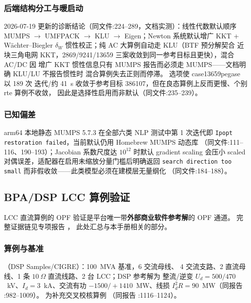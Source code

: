 \subsubsection*{后端结构分工与暖启动}
2026-07-19 更新的诊断结论（同文件:224--289，文档实测）：线性代数默认顺序
MUMPS $\to$ UMFPACK $\to$ KLU $\to$ Eigen；Newton 系统默认增广 KKT +
W\"achter--Biegler $\delta_W$ 惯性校正；纯 AC 大算例自动走 KLU（BTF 预分解契合
近块三角电网 KKT，2869/9241/13659 三案收敛到同一参考目标且更快），混合 AC/DC 因
增广 KKT 惯性信息只有 MUMPS 报告而必须走 MUMPS——文档明确 KLU/LU 不报告惯性时
混合算例失去正则而停滞。 选项使 case13659pegase 以 189 次
迭代/约 41~s 收敛于参考目标 386107，但在良态算例上反而更慢、个别 rte 算例不收敛，
因此是选择性启用而非默认（同文件:235--239）。

\subsubsection*{已知偏差}
arm64 本地静态 MUMPS 5.7.3 在全部六类 NLP 测试中第 1 次迭代即
\texttt{Ipopt restoration failed}，当前默认仍用 Homebrew MUMPS 动态库
（同文件:111--116、190--193）；Jacobian 系数尺度达 $10^{12}$ 时默认 gradient
scaling 会压小 scaled 对偶误差，适配器在启用未缩放分量门槛后明确返回
\texttt{search direction too small} 而非假收敛——此类模型必须在建模层无量纲化
（同文件:184--188）。

\subsection{BPA/DSP LCC 算例验证}\label{subsec:ver:lcc}

LCC 直流算例的 OPF 验证是平台唯一带\textbf{外部商业软件参考解}的 OPF 通道。
完整证据链见专项报告
，
此处汇总与本手册相关的部分。

\subsubsection*{算例与基准}
（DSP Samples/CIGRE）：100~MVA 基准，6 交流母线、
4 交流支路、2 直流母线、1 条 $10~\Omega$ 直流线路、2 台 LCC；DSP 参考解为
整流/逆变 $U_d=500/470$~kV、$I_d=3$~kA、交流有功 $-1500/+1410$~MW、线损
$I_d^2R=90$~MW（同报告 :982--1009）。 为补充交叉校核算例
（同报告 :1116--1124）。

